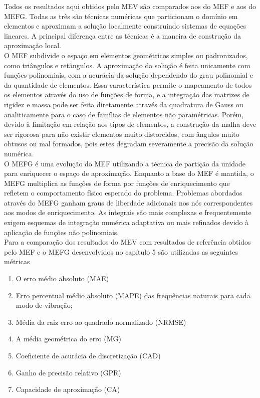 \indent Todos os resultados aqui obtidos pelo MEV são comparados aos do MEF e aos do MEFG. Todas as três são técnicas numéricas que particionam o domínio em elementos e aproximam a solução localmente construindo sistemas de equações lineares. A principal diferença entre as técnicas é a maneira de construção da aproximação local.\\
\indent O MEF subdivide o espaço em elementos geométricos simples ou padronizados, como triângulos e retângulos. A aproximação da solução é feita unicamente com funções polinomiais, com a acurácia da solução dependendo do grau polinomial e da quantidade de elementos. Essa característica permite o mapeamento de todos os elementos através do uso de funções de forma, e a integração das matrizes de rigidez e massa pode ser feita diretamente através da quadratura de Gauss ou analiticamente para o caso de famílias de elementos não paramétricas. Porém, devido à limitação em relação aos tipos de elementos, a construção da malha deve ser rigorosa para não existir elementos muito distorcidos, com ângulos muito obtusos ou mal formados, pois estes degradam severamente a precisão da solução numérica.\\
\indent O MEFG é uma evolução do MEF utilizando a técnica de partição da unidade para enriquecer o espaço de aproximação. Enquanto a base do MEF é mantida, o MEFG multiplica as funções de forma por funções de enriquecimento que refletem o comportamento físico esperado do problema. Problemas abordados através do MEFG ganham graus de liberdade adicionais nos nós correspondentes aos modos de enriquecimento. As integrais são mais complexas e frequentemente exigem esquemas de integração numérica adaptativa ou mais refinados devido à aplicação de funções não polinomiais.\\
\indent Para a comparação dos resultados do MEV com resultados de referência obtidos pelo MEF e o MEFG desenvolvidos no capítulo 5 são
utilizadas as seguintes métricas
    \begin{enumerate}
        \item O erro médio absoluto (MAE)
        \item Erro percentual médio absoluto (MAPE) das frequências naturais para cada modo de vibração;
        \item Média da raiz erro ao quadrado normalizado (NRMSE)
        \item A média geométrica do erro (MG)
        \item Coeficiente de acurácia de discretização (CAD)
        \item Ganho de precisão relativo (GPR)
        \item Capacidade de aproximação (CA)
    \end{enumerate}
    

